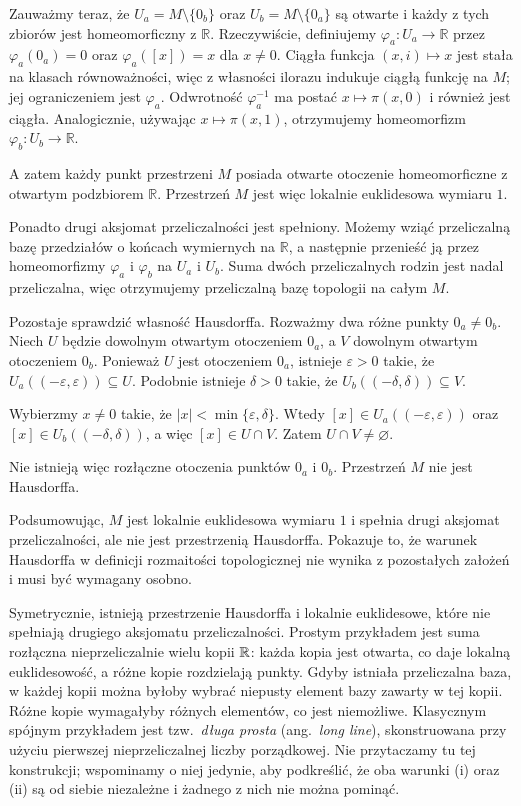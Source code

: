 \begin{przyklad}
Zauważmy teraz, że $U_a=M\setminus\{0_b\}$ oraz $U_b=M\setminus\{0_a\}$ są otwarte i każdy z tych zbiorów jest homeomorficzny z $\mathbb{R}$. Rzeczywiście, definiujemy $\varphi_a\colon U_a\to\mathbb{R}$ przez $\varphi_a(0_a)=0$ oraz $\varphi_a([x])=x$ dla $x\neq0$. Ciągła funkcja $(x,i)\mapsto x$ jest stała na klasach równoważności,
więc z własności ilorazu indukuje ciągłą funkcję na $M$;
jej ograniczeniem jest $\varphi_a$. Odwrotność $\varphi_a^{-1}$ ma postać
$x\mapsto\pi(x,0)$ i również jest ciągła. Analogicznie, używając
$x\mapsto\pi(x,1)$, otrzymujemy homeomorfizm
$\varphi_b\colon U_b\to\mathbb{R}$.

A zatem każdy punkt przestrzeni $M$ posiada otwarte otoczenie homeomorficzne z otwartym podzbiorem $\mathbb{R}$. Przestrzeń $M$ jest więc lokalnie euklidesowa wymiaru $1$.

Ponadto drugi aksjomat przeliczalności jest spełniony. Możemy wziąć przeliczalną bazę przedziałów o końcach wymiernych na $\mathbb{R}$, a następnie przenieść ją przez homeomorfizmy $\varphi_a$ i $\varphi_b$ na $U_a$ i $U_b$. Suma dwóch przeliczalnych rodzin jest nadal przeliczalna, więc otrzymujemy przeliczalną bazę topologii na całym $M$.

Pozostaje sprawdzić własność Hausdorffa. Rozważmy dwa różne punkty $0_a\neq0_b$. Niech $U$ będzie dowolnym otwartym otoczeniem $0_a$, a $V$ dowolnym otwartym otoczeniem $0_b$. Ponieważ $U$ jest otoczeniem $0_a$, istnieje $\varepsilon>0$ takie, że $U_a((-\varepsilon,\varepsilon))\subseteq U$. Podobnie istnieje $\delta>0$ takie, że $U_b((-\delta,\delta))\subseteq V$.

Wybierzmy $x\neq0$ takie, że $|x|<\min\{\varepsilon,\delta\}$. Wtedy $[x]\in U_a((-\varepsilon,\varepsilon))$ oraz $[x]\in U_b((-\delta,\delta))$, a więc $[x]\in U\cap V$. Zatem $U\cap V\neq\varnothing$.

Nie istnieją więc rozłączne otoczenia punktów $0_a$ i $0_b$. Przestrzeń $M$ nie jest Hausdorffa.

Podsumowując, $M$ jest lokalnie euklidesowa wymiaru $1$ i spełnia drugi aksjomat przeliczalności, ale nie jest przestrzenią Hausdorffa. Pokazuje to, że warunek Hausdorffa w definicji rozmaitości topologicznej nie wynika z pozostałych założeń i musi być wymagany osobno.
\end{przyklad}

\begin{uwaga}
Symetrycznie, istnieją przestrzenie Hausdorffa i lokalnie euklidesowe, które nie spełniają
drugiego aksjomatu przeliczalności. Prostym przykładem jest suma
rozłączna nieprzeliczalnie wielu kopii $\mathbb{R}$: każda kopia jest otwarta,
co daje lokalną euklidesowość, a różne kopie rozdzielają punkty.
Gdyby istniała przeliczalna baza, w każdej kopii można byłoby wybrać
niepusty element bazy zawarty w tej kopii. Różne kopie wymagałyby
różnych elementów, co jest niemożliwe.
Klasycznym spójnym przykładem jest tzw.\ \emph{długa prosta}
(ang.\ \emph{long line}), skonstruowana przy użyciu pierwszej nieprzeliczalnej liczby
porządkowej. Nie przytaczamy tu tej konstrukcji; wspominamy o niej jedynie, aby podkreślić,
że oba warunki (i) oraz (ii) są od siebie niezależne i żadnego z nich nie można pominąć.
\end{uwaga}

